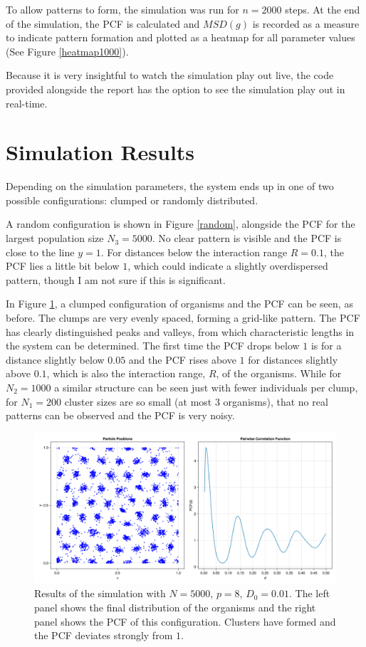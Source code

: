 \documentclass{article}
\begin{document}
To allow patterns to form, the simulation was run for $n=2000$ steps. 
At the end of the simulation, the PCF is calculated and $MSD(g)$ is recorded as a measure to indicate pattern formation and plotted as a heatmap for all parameter values (See Figure \ref{heatmap1000}).

Because it is very insightful to watch the simulation play out live, the code provided alongside the report has the option to see the simulation play out in real-time.

\section{Simulation Results} \label{secres}

Depending on the simulation parameters, the system ends up in one of two possible configurations: clumped or randomly distributed.

A random configuration is shown in Figure \ref{random}, alongside the PCF for the largest population size $N_3=5000$. 
No clear pattern is visible and the PCF is close to the line $y=1$.
For distances below the interaction range $R=0.1$, the PCF lies a little bit below $1$, which could indicate a slightly overdispersed pattern, though I am not sure if this is significant.

In Figure \ref{clumped}, a clumped configuration of organisms and the PCF can be seen, as before.
The clumps are very evenly spaced, forming a grid-like pattern. 
The PCF has clearly distinguished peaks and valleys, from which characteristic lengths in the system can be determined.
The first time the PCF drops below $1$ is for a distance slightly below $0.05$ and the PCF rises above $1$ for distances slightly above $0.1$, which is also the interaction range, $R$, of the organisms.
While for $N_2=1000$ a similar structure can be seen just with fewer individuals per clump, for $N_1=200$ cluster sizes are so small (at most $3$ organisms), that no real patterns can be observed and the PCF is very noisy.
\begin{figure}
    \includegraphics[width=0.8\linewidth]{img/rp159_N5000_D01_p8.png}
    \caption{Results of the simulation with $N=5000$, $p=8$, $D_0=0.01$. The left panel shows the final distribution of the organisms and the right panel shows the PCF of this configuration. Clusters have formed and the PCF deviates strongly from $1$.}
    \label{clumped}
\end{figure}
\end{document}
